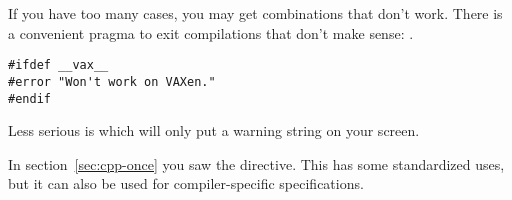 If you have too many  cases, you may
get combinations that don't work.
There is a convenient pragma to exit compilations that don't make sense:
.
\begin{verbatim}
#ifdef __vax__
#error "Won't work on VAXen."
#endif
\end{verbatim}

Less serious is  which will only
put a warning string on your screen.

In section~\ref{sec:cpp-once} you saw the  directive.
This has some standardized uses, but it can also be used
for compiler-specific specifications.
